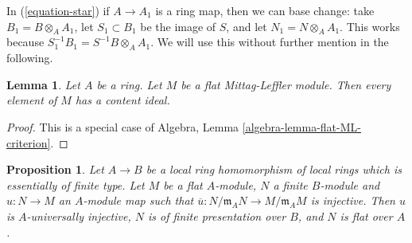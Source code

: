 \documentclass{amsart}
\theoremstyle{plain}
\newtheorem{proposition}[subsection]{Proposition}
\newtheorem{lemma}[subsection]{Lemma}
\theoremstyle{definition}
\theoremstyle{remark}
\numberwithin{equation}{subsection}
\begin{document}
\medskip\noindent
In (\ref{equation-star}) if $A \to A_1$ is a ring map, then we
can base change: take $B_1 = B \otimes_A A_1$, let $S_1 \subset B_1$
be the image of $S$, and let $N_1 = N \otimes_A A_1$. This works
because $S_1^{-1}B_1 = S^{-1}B \otimes_A A_1$. We will use this
without further mention in the following.


\begin{lemma}
\label{more-algebra-lemma-content-exists-flat-Mittag-Leffler}
Let $A$ be a ring. Let $M$ be a flat Mittag-Leffler module.
Then every element of $M$ has a content ideal.
\end{lemma}

\begin{proof}
This is a special case of Algebra, Lemma \ref{algebra-lemma-flat-ML-criterion}.
\end{proof}



\begin{proposition}
\label{proposition-finite-type-injective-into-flat-mod-m}
Let $A \to B$ be a local ring homomorphism of local rings
which is essentially of finite type. Let $M$ be a flat $A$-module,
$N$ a finite $B$-module and $u : N \to M$ an $A$-module map such that
$\overline{u} : N/\mathfrak m_AN \to M/\mathfrak m_AM$ is injective.
Then $u$ is $A$-universally injective, $N$ is of finite presentation over
$B$, and $N$ is flat over $A$.
\end{proposition}
\end{document}
